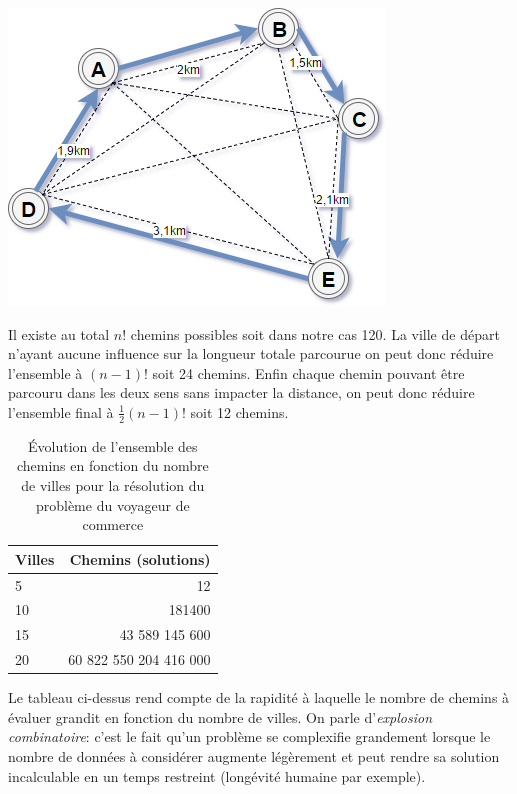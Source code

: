 \begin{center}
    \includegraphics[scale=0.6]{../ressources/images/probleme_voyageur.png}
\end{center}

Il existe au total $n!$ chemins possibles soit dans notre cas 120. La ville de départ n'ayant aucune influence sur la longueur totale parcourue on peut donc réduire l'ensemble à $(n-1)!$ soit 24 chemins. Enfin chaque chemin pouvant être parcouru dans les deux sens sans impacter la distance,  on peut donc réduire l'ensemble final à $\frac{1}{2}(n-1)!$ soit 12 chemins.

\begin{table}[h]
\centering
\begin{tabular}{ l|r }
  Villes & Chemins (solutions) \\
  \hline
  5 & 12 \\
  10 & 181400 \\
  15 & 43 589 145 600 \\
  20 & 60 822 550 204 416 000 \\
\end{tabular}
  \caption{Évolution de l'ensemble des chemins en fonction du nombre de villes pour la résolution du problème du voyageur de commerce}
\end{table}

Le tableau ci-dessus rend compte de la rapidité à laquelle le nombre de chemins à évaluer grandit en fonction du nombre de villes. On parle d'\textit{explosion combinatoire}: c'est le fait qu'un problème se complexifie grandement lorsque le nombre de données à considérer augmente légèrement et peut rendre sa solution incalculable en un temps restreint (longévité humaine par exemple).

